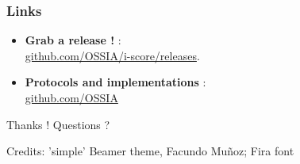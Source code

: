 \documentclass{beamer}
\begin{document}
\begin{frame}
    \frametitle{Links}
    \begin{itemize}
        \item \textbf{Grab a release !} :~\\ \url{github.com/OSSIA/i-score/releases}. 
        \item \textbf{Protocols and implementations} :~\\
        \url{github.com/OSSIA}
    \end{itemize}
        
    \centering
    \vspace{2cm}
    \Large{Thanks ! Questions ?}
    \vspace{2cm}
    
    \small{Credits: 'simple' Beamer theme, Facundo Muñoz; Fira font}
\end{frame}    
\end{document}
